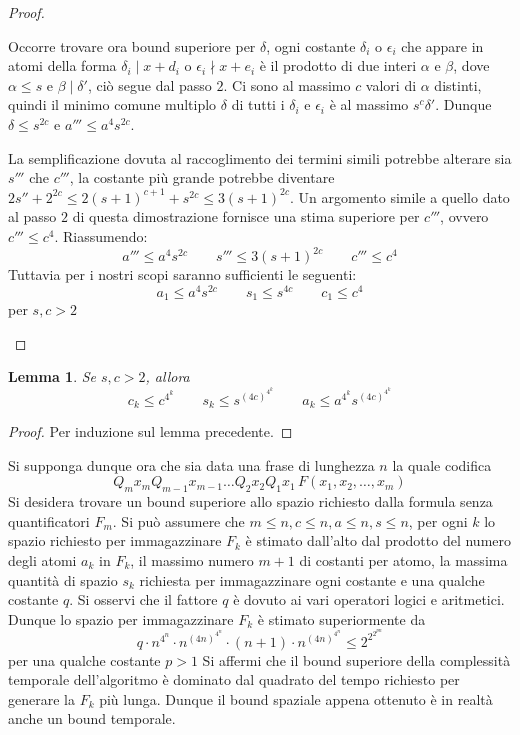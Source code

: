 \documentclass[11pt,letterpaper,twoside]{article}
\newtheorem{lemma}{Lemma}
\begin{document}
\begin{proof}
\begin{enumerate}[label=Step \arabic*.]
    Occorre trovare ora bound superiore per $\delta$, ogni costante $\delta_i$ o
    $\epsilon_i$ che appare in atomi della forma $\delta_i \mid x + d_i$ o
    $\epsilon_i \nmid x + e_i$ è il prodotto di due interi $\alpha$ e $\beta$,
    dove $\alpha \le s$ e $\beta \mid \delta'$, ciò segue dal passo $2$.
    Ci sono al massimo $c$ valori di $\alpha$ distinti, quindi il minimo comune
    multiplo $\delta$ di tutti i $\delta_i$ e $\epsilon_i$ è al massimo
    $s^c\delta'$. Dunque $\delta \le s^{2c}$ e $a''' \le a^4s^{2c}$.

    La semplificazione dovuta al raccoglimento dei termini simili potrebbe
    alterare sia $s'''$ che $c'''$, la costante più grande potrebbe diventare
    $2s'' + 2^{2c} \le 2(s+1)^{c+1}+s^{2c} \le 3(s+1)^{2c}$.
    Un argomento simile a quello dato al passo $2$ di questa dimostrazione
    fornisce una stima superiore per $c'''$, ovvero $c''' \le c^4$. Riassumendo:
    $$ a''' \le a^4s^{2c} \qquad s''' \le 3(s + 1)^{2c} \qquad c''' \le c^4 $$
    Tuttavia per i nostri scopi saranno sufficienti le seguenti:
    $$ a_1 \le a^4s^{2c} \qquad s_1 \le s^{4c} \qquad c_1 \le c^4 $$
    per $s, c > 2$
  \end{enumerate}
\end{proof}

\begin{lemma}
  Se $s, c > 2$, allora
  $$ c_k \le c^{4^k} \qquad s_k \le s^{(4c)^{4^k}} \qquad a_k \le a^{4^k}s^{(4c)^{4^k}}$$
\end{lemma}
\begin{proof}
  Per induzione sul lemma precedente.
\end{proof}

Si supponga dunque ora che sia data una frase di lunghezza $n$ la quale codifica
$$Q_m x_m Q_{m-1} x_{m-1} \dots Q_2 x_2 Q_1 x_1 \, F(x_1, x_2, \dots, x_m)$$
Si desidera trovare un bound superiore allo spazio richiesto dalla formula senza
quantificatori $F_m$. Si può assumere che $m \le n, c \le n, a \le n, s \le n$,
per ogni $k$ lo spazio richiesto per immagazzinare $F_k$ è stimato dall'alto dal
prodotto del numero degli atomi $a_k$ in $F_k$, il massimo numero $m+1$ di
costanti per atomo, la massima quantità di spazio $s_k$ richiesta per
immagazzinare ogni costante e una qualche costante $q$. Si osservi che il
fattore $q$ è dovuto ai vari operatori logici e aritmetici.
Dunque lo spazio per immagazzinare $F_k$ è stimato superiormente da
$$ q \cdot n^{4^n} \cdot n^{(4n)^{4^n}} \cdot (n+1) \cdot n^{(4n)^{4^n}} \le
2^{2^{2^{pn}}}$$
per una qualche costante $p > 1$
Si affermi che il bound superiore della complessità temporale dell'algoritmo è
dominato dal quadrato del tempo richiesto per generare la $F_k$ più
lunga. Dunque il bound spaziale appena ottenuto è in realtà anche un bound
temporale.
\end{document}
